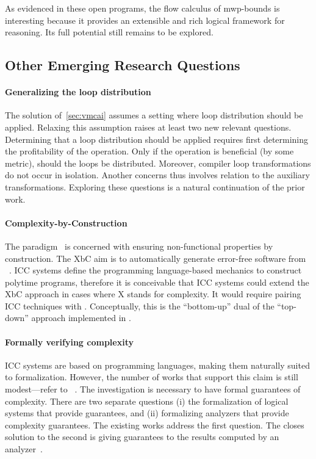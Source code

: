 As evidenced in these open programs, the flow calculus of mwp-bounds is
interesting because it provides an extensible and rich logical framework for
reasoning. Its full potential still remains to be explored.

\subsection{Other Emerging Research Questions}
\label{ssec:other-open}

\paragraph*{Generalizing the loop distribution}
The solution of~\autoref{sec:vmcai} assumes a setting where loop distribution
should be applied. Relaxing this assumption raises at least two new relevant
questions. Determining that a loop distribution should be applied requires first
determining the profitability of the operation. Only if the operation is
beneficial (by some metric), should the loops be distributed. Moreover, compiler
loop transformations do not occur in isolation. Another concerns thus involves
relation to the auxiliary transformations. Exploring these questions is a
natural continuation of the prior work.

\paragraph*{Complexity-by-Construction}
The  paradigm~\cite{terbeek2018} is concerned with
ensuring non-functional properties by
construction. The XbC aim is to automatically generate error-free software from
~\cite{terbeek2020}. ICC systems define the programming
language-based mechanics to construct polytime programs, therefore it is
conceivable that ICC systems could extend the XbC approach in cases where X
stands for complexity. It would require pairing ICC techniques with . Conceptually, this is the \enquote{bottom-up} dual of the
\enquote{top-down} approach implemented in .

\paragraph*{Formally verifying complexity}
ICC systems are based on programming languages, making them naturally suited
to formalization. However, the number of works that support this claim is
still modest---refer to \eg~\cite{feree2018,heraud2011,atkey2024}. The
investigation is necessary to have formal guarantees of complexity. There
are two separate questions (i) the formalization of logical systems that
provide guarantees, and (ii) formalizing analyzers that provide complexity
guarantees. The existing works address the first question. The closes
solution to the second is giving guarantees to the results computed by an
analyzer~\cite{carbonneaux2017}.

